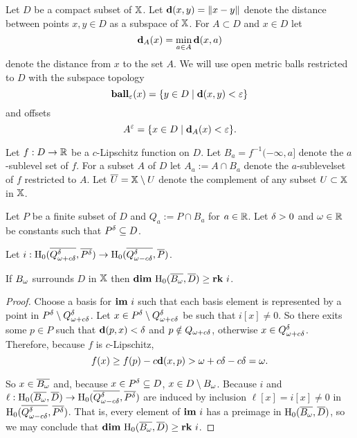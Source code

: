 
Let $D$ be a compact subset of $\X$.
Let $\dist(x, y) = \|x - y\|$ denote the distance between points $x,y\in D$ as a subspace of $\X$.
For $A\subset D$ and $x\in D$ let
\[\dist_A(x) = \min_{a\in A}\dist(x, a)\]
denote the distance from $x$ to the set $A$.
We will use open metric balls restricted to $D$ with the subspace topology
\[\ball_\e(x) = \{y\in D\mid \dist(x, y) < \e\}\]
and offsets
\[A^\e = \{x\in D\mid \dist_A(x) < \e\}.\]

Let $f : D\to \R$ be a $c$-Lipschitz function on $D$.
Let $B_a = f^{-1}(-\infty, a]$ denote the $a$-sublevel set of $f$.
For a subset $A$ of $D$ let $A_a := A\cap B_a$ denote the $a$-sublevelset of $f$ restricted to $A$.
Let $\overline{U} = \X\setminus U$ denote the complement of any subset $U\subset \X$ in $\X$.

Let $P$ be a finite subset of $D$ and $Q_a := P\cap B_a$ for $a\in\R$.
Let $\of > 0 $ and $\omega\in \R$ be constants such that $\P\subseteq D$.

\begin{lemma}\label{lem:psurj}
  Let $i : \hom_0(\cmp{\QQ^\of}, \cmp{\P})\to \hom_0(\cmp{\Q^\of}, \cmp{P})$.

  If $\B$ surrounds $D$ in $\X$ then $\dim~\hom_0(\cmp{\B}, \cmp{D})\geq \rk~i$.
\end{lemma}
\begin{proof}
  Choose a basis for $\im~i$ such that each basis element is represented by a point in $\P\setminus \QQ^\of$.
  Let $x\in \P\setminus \QQ^\of$ be such that $i[x] \neq 0$.
  So there exits some $p\in P$ such that $\dist(p, x) < \delta$ and $p\notin \QQ$, otherwise $x\in\QQ^\of$.
  Therefore, because $f$ is $c$-Lipschitz,
  \[ f(x)\geq f(p) - c\dist(x, p) > \fenn - c\of =\omega.\]

  So $x\in\cmp{\B}$ and, because $x\in \P\subseteq D$, $x\in D\setminus \B$.
  Because $i$ and $\ell : \hom_0(\cmp{\B}, \cmp{D})\to \hom_0(\cmp{\Q^\of}, \cmp{\P})$ are induced by inclusion $\ell[x] = i[x]\neq 0$ in $\hom_0(\cmp{\Q^\of}, \cmp{\P})$.
  That is, every element of $\im~i$ has a preimage in $\hom_0(\cmp{\B}, \cmp{D})$, so we may conclude that $\dim~\hom_0(\cmp{\B}, \cmp{D})\geq \rk~i$.
\end{proof}

